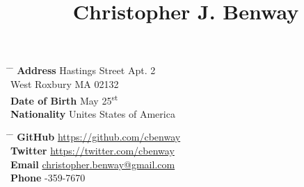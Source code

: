 \documentclass[a4paper, 10pt]{article}
\date{\vspace{-10ex}}
\begin{document}
\title{\vspace{-12ex}Christopher J. Benway}

\maketitle


\parbox[t]{0.5\textwidth}{
\begin{tabbing}
\hspace{3cm} \= \hspace{4cm} \= \kill
{\bf Address}  Hastings Street Apt. 2\\
\> West Roxbury MA 02132 \\
{\bf Date of Birth}  May 25\textsuperscript{st} \\
{\bf Nationality} \> Unites States of America \\
\end{tabbing}
}
\hfil
\parbox[t]{0.5\textwidth}{
\begin{tabbing}
\hspace{2cm} \= \hspace{4cm} \= \kill
{\bf GitHub} \> \href{https://github.com/cbenway}{https://github.com/cbenway} \\
{\bf Twitter} \> \href{https://twitter.com/cbenway}{https://twitter.com/cbenway} \\
{\bf Email} \> \href{mailto:christopher.benway@gmail.com}{christopher.benway@gmail.com} \\
{\bf Phone} -359-7670
\end{tabbing}
}

\end{document}
